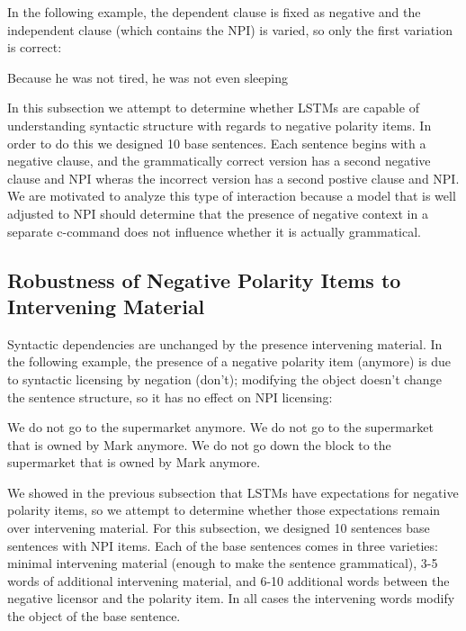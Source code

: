 \documentclass[11pt, round]{article}
\begin{document}
In the following example, the dependent clause is fixed as negative and the independent clause (which contains the NPI) is varied, so only the first variation is correct:
\begin{exe}
\ex
\begin{xlist}
\ex Because he was not tired, he was not even sleeping
\end{xlist}
\end{exe}
In this subsection we attempt to determine whether LSTMs are capable of understanding syntactic structure with regards to negative polarity items. In order to do this we designed 10 base sentences. Each sentence begins with a negative clause, and the grammatically correct version has a second negative clause and NPI wheras the incorrect version has a second postive clause and NPI. We are motivated to analyze this type of interaction because a model that is well adjusted to NPI should determine that the presence of negative context in a separate c-command does not influence whether it is actually grammatical.

\subsection{Robustness of Negative Polarity Items to Intervening Material}
Syntactic dependencies are unchanged by the presence intervening material. In the following example, the presence of a negative polarity item (anymore) is due to syntactic licensing by negation (don't); modifying the object doesn't change the sentence structure, so it has no effect on NPI licensing:
\begin{exe}
\ex
\begin{xlist}
\ex We do not go to the supermarket anymore.
\ex We do not go to the supermarket that is owned by Mark anymore.
\ex We do not go down the block to the supermarket that is owned by Mark anymore. 
\end{xlist}
\end{exe}
We showed in the previous subsection that LSTMs have expectations for negative polarity items, so we attempt to determine whether those expectations remain over intervening material. For this subsection, we designed 10 sentences base sentences with NPI items. Each of the base sentences comes in three varieties: minimal intervening material (enough to make the sentence grammatical), 3-5 words of additional intervening material, and 6-10 additional words between the negative licensor and the polarity item. In all cases the intervening words modify the object of the base sentence.
\end{document}
